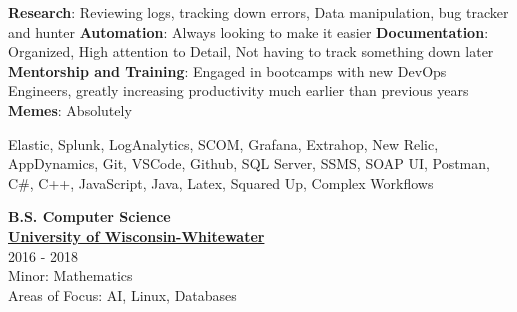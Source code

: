 \documentclass[a4paper]{mctemplate} %
\begin{document}
\begin{sidebar}

\makepicture{2.1cm}


\begin{contacttable}
\end{contacttable}


\begin{skilltable}
	\skillitem
	{\textbf{Research}: Reviewing logs, tracking down errors, Data manipulation, bug tracker and hunter}
	\skillitem
	{\textbf{Automation}: Always looking to make it easier}
	\skillitem
	{\textbf{Documentation}: Organized, High attention to Detail, Not having to track something down later}
	\skillitem
	{\textbf{Mentorship and Training}: Engaged in bootcamps with new DevOps Engineers, greatly increasing productivity much earlier than previous years}
	\skillitem
	{\textbf{Memes}: Absolutely}
\end{skilltable}




\begin{codingtable}
	{Elastic, Splunk, LogAnalytics, SCOM, Grafana, Extrahop, New Relic, AppDynamics, Git, VSCode, Github, SQL Server, SSMS, SOAP UI, Postman, C\#, C++, JavaScript, Java, Latex, Squared Up, Complex Workflows}
\end{codingtable}

\begin{education}
    {\textbf{B.S. Computer Science}} \\ 
    {\href{https://www.uww.edu/}{\textbf{University of Wisconsin-Whitewater}}} \\
    {2016 - 2018} \\
    {Minor: Mathematics} \\
    {Areas of Focus: AI, Linux, Databases}
\end{education}

\end{sidebar}
\end{document}
